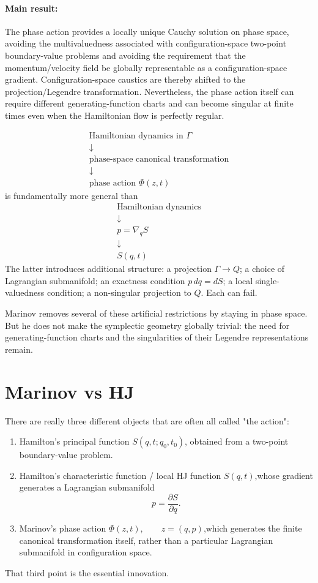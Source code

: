 \paragraph{Main result:} The phase action provides a locally unique Cauchy
solution on phase space, avoiding the multivaluedness associated with
configuration-space two-point boundary-value problems and avoiding the
requirement that the momentum/velocity field be globally representable as a
configuration-space gradient. Configuration-space caustics are thereby shifted
to the projection/Legendre transformation. Nevertheless, the phase action
itself can require different generating-function charts and can become singular
at finite times even when the Hamiltonian flow is perfectly regular.

$$ \boxed{ \begin{array}{c} 
\text{Hamiltonian dynamics in }\Gamma\\[2mm] 
\downarrow\\
\text{phase-space canonical transformation}\\[2mm]
\downarrow\\ 
\text{phase action }\Phi(z,t) 
\end{array}} $$
is fundamentally more general than
$$ \boxed{ \begin{array}{c} 
\text{Hamiltonian dynamics}\\ 
\downarrow\\ 
    p=\nabla_qS\\ 
\downarrow\\ 
    S(q,t) 
\end{array}} $$
The latter introduces additional structure:
a projection \(\Gamma\to Q\);
a choice of Lagrangian submanifold;
an exactness condition \(p\,dq=dS\);
a local single-valuedness condition;
a non-singular projection to \(Q\).
Each can fail.

Marinov removes several of these artificial restrictions by staying in phase
space.
But he does not make the symplectic geometry globally trivial: the need for
generating-function charts and the singularities of their Legendre
representations remain.

\section{Marinov vs HJ}

There are really three different objects that are often all called "the action":
\begin{enumerate}
   \item Hamilton's principal function $ S(q,t;q_0,t_0)$, obtained from a
       two-point boundary-value problem.
   \item Hamilton's characteristic function / local HJ function $ S(q,t)$,whose
       gradient generates a Lagrangian submanifold 
        \[p=\frac{\partial S}{\partial q}.\]
   \item Marinov's phase action $\Phi(z,t),\qquad z=(q,p)$,which generates the
       finite canonical transformation itself, rather than a particular
        Lagrangian submanifold in configuration space.
\end{enumerate}
That third point is the essential innovation.

